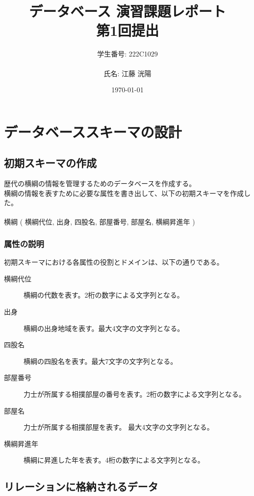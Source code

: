 \documentclass[a4j,12pt]{jreport}
\title{ データベース 演習課題レポート\\第1回提出}
\author{学生番号: 222C1029\\\\氏名: 江藤 洸陽}
\date{\today}
\begin{document}
\maketitle

\chapter{データベーススキーマの設計}

\section{初期スキーマの作成}
歴代の横綱の情報を管理するためのデータベースを作成する。\\
横綱の情報を表すために必要な属性を書き出して、以下の初期スキーマを作成した。\\
\\
横綱 ( 横綱代位, 出身, 四股名, 部屋番号, 部屋名, 横綱昇進年 )

\subsection{属性の説明}

初期スキーマにおける各属性の役割とドメインは、以下の通りである。

\begin{description}

\item[横綱代位]
横綱の代数を表す。2桁の数字による文字列となる。

\item[出身]
横綱の出身地域を表す。最大4文字の文字列となる。

\item[四股名]
横綱の四股名を表す。最大7文字の文字列となる。
  
\item[部屋番号]
力士が所属する相撲部屋の番号を表す。2桁の数字による文字列となる。

\item[部屋名]
力士が所属する相撲部屋を表す。 最大4文字の文字列となる。

\item[横綱昇進年]
横綱に昇進した年を表す。4桁の数字による文字列となる。

\end{description}

\section{リレーションに格納されるデータ}
\end{document}
